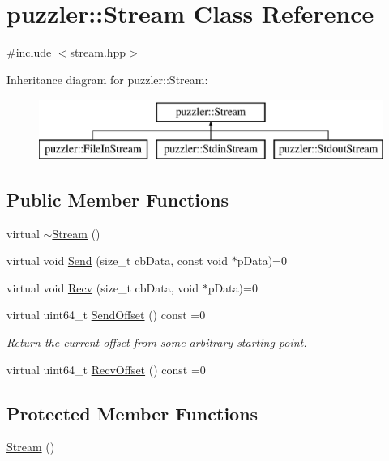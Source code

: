 \hypertarget{a00031}{}\section{puzzler\+:\+:Stream Class Reference}
\label{a00031}


{\ttfamily \#include $<$stream.\+hpp$>$}

Inheritance diagram for puzzler\+:\+:Stream\+:\begin{figure}[H]
\begin{center}
\leavevmode
\includegraphics[height=2.000000cm]{a00031}
\end{center}
\end{figure}
\subsection*{Public Member Functions}
\begin{DoxyCompactItemize}
\item 
virtual \hyperlink{a00031_a35913f703d06d47519dba26e89bc32e4}{$\sim$\+Stream} ()
\item 
virtual void \hyperlink{a00031_af265fbd2a09604565fa2df2f2227dba5}{Send} (size\+\_\+t cb\+Data, const void $\ast$p\+Data)=0
\item 
virtual void \hyperlink{a00031_a700b50890c0adb2af0800b43b1ac0d5f}{Recv} (size\+\_\+t cb\+Data, void $\ast$p\+Data)=0
\item 
virtual uint64\+\_\+t \hyperlink{a00031_ab5bcc5ea2ee81ac074bee05c5459af27}{Send\+Offset} () const =0
\begin{DoxyCompactList}\small\item\em Return the current offset from some arbitrary starting point. \end{DoxyCompactList}\item 
virtual uint64\+\_\+t \hyperlink{a00031_aa4ddc05c400ec1833c7beb8af9b0cbe4}{Recv\+Offset} () const =0
\end{DoxyCompactItemize}
\subsection*{Protected Member Functions}
\begin{DoxyCompactItemize}
\item 
\hyperlink{a00031_a723d56e05bbce43eb9a63c2db96acf65}{Stream} ()
\end{DoxyCompactItemize}


